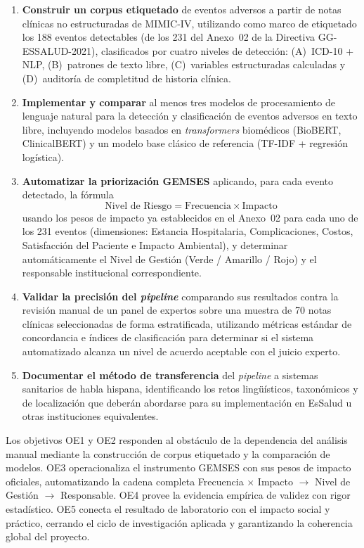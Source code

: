 \begin{enumerate}[label=\textbf{OE\arabic*.}, leftmargin=*, itemsep=6pt]

    \item \textbf{Construir un corpus etiquetado} de eventos adversos a partir de notas clínicas no estructuradas de MIMIC-IV, utilizando como marco de etiquetado los 188 eventos detectables (de los 231 del Anexo~02 de la Directiva GG-ESSALUD-2021), clasificados por cuatro niveles de detección: (A)~ICD-10 + NLP, (B)~patrones de texto libre, (C)~variables estructuradas calculadas y (D)~auditoría de completitud de historia clínica.

    \item \textbf{Implementar y comparar} al menos tres modelos de procesamiento de lenguaje natural para la detección y clasificación de eventos adversos en texto libre, incluyendo modelos basados en \textit{transformers} biomédicos (BioBERT, ClinicalBERT) y un modelo base clásico de referencia (TF-IDF + regresión logística).

    \item \textbf{Automatizar la priorización GEMSES} aplicando, para cada evento detectado, la fórmula
    \[
        \text{Nivel de Riesgo} = \text{Frecuencia} \times \text{Impacto}
    \]
    usando los pesos de impacto ya establecidos en el Anexo~02 para cada uno de los 231 eventos (dimensiones: Estancia Hospitalaria, Complicaciones, Costos, Satisfacción del Paciente e Impacto Ambiental), y determinar automáticamente el Nivel de Gestión (Verde / Amarillo / Rojo) y el responsable institucional correspondiente.

    \item \textbf{Validar la precisión del \textit{pipeline}} comparando sus resultados contra la revisión manual de un panel de expertos sobre una muestra de 70 notas clínicas seleccionadas de forma estratificada, utilizando métricas estándar de concordancia e índices de clasificación para determinar si el sistema automatizado alcanza un nivel de acuerdo aceptable con el juicio experto.

    \item \textbf{Documentar el método de transferencia} del \textit{pipeline} a sistemas sanitarios de habla hispana, identificando los retos lingüísticos, taxonómicos y de localización que deberán abordarse para su implementación en EsSalud u otras instituciones equivalentes.

\end{enumerate}

\vspace{6pt}
Los objetivos OE1 y OE2 responden al obstáculo de la dependencia del análisis manual mediante la construcción de corpus etiquetado y la comparación de modelos. OE3 operacionaliza el instrumento GEMSES con sus pesos de impacto oficiales, automatizando la cadena completa Frecuencia $\times$ Impacto $\rightarrow$ Nivel de Gestión $\rightarrow$ Responsable. OE4 provee la evidencia empírica de validez con rigor estadístico. OE5 conecta el resultado de laboratorio con el impacto social y práctico, cerrando el ciclo de investigación aplicada y garantizando la coherencia global del proyecto.

